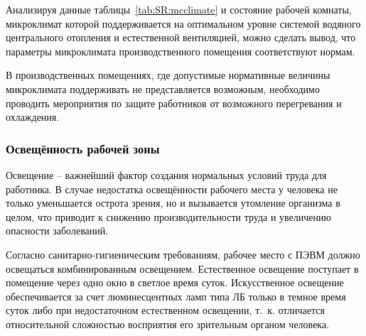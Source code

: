 Анализируя данные таблицы~\ref{tab:SR:mcclimate} и состояние рабочей комнаты, микроклимат которой поддерживается на оптимальном уровне системой водяного центрального отопления и естественной вентиляцией, можно сделать вывод, что параметры микроклимата производственного помещения соответствуют нормам.

В производственных помещениях, где допустимые нормативные величины микроклимата поддерживать не представляется возможным, необходимо проводить мероприятия по защите работников от возможного перегревания и охлаждения. 



\subsubsection{Освещённость рабочей зоны}

Освещение -- важнейший фактор создания нормальных условий труда для работника. 
В случае недостатка освещённости рабочего места у человека не только уменьшается острота зрения, но и вызывается утомление организма в целом, что приводит к снижению производительности труда и увеличению опасности заболеваний.

Согласно санитарно-гигиеническим требованиям, рабочее место с ПЭВМ должно освещаться комбинированным освещением. 
Естественное освещение поступает в помещение через одно окно в светлое время суток. 
Искусственное освещение обеспечивается за счет люминесцентных ламп типа ЛБ только в темное время суток либо при недостаточном естественном освещении, т.~к. отличается относительной сложностью восприятия его зрительным органом человека.

